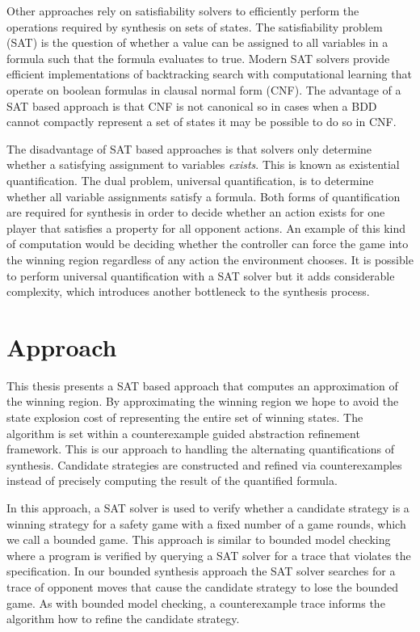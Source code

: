 Other approaches rely on satisfiability solvers to efficiently perform the operations required by synthesis on sets of states. The satisfiability problem (SAT) is the question of whether a value can be assigned to all variables in a formula such that the formula evaluates to true. Modern SAT solvers provide efficient implementations of backtracking search with computational learning that operate on boolean formulas in clausal normal form (CNF). The advantage of a SAT based approach is that CNF is not canonical so in cases when a BDD cannot compactly represent a set of states it may be possible to do so in CNF.

The disadvantage of SAT based approaches is that solvers only determine whether a satisfying assignment to variables \emph{exists}. This is known as existential quantification. The dual problem, universal quantification, is to determine whether all variable assignments satisfy a formula. Both forms of quantification are required for synthesis in order to decide whether an action exists for one player that satisfies a property for all opponent actions. An example of this kind of computation would be deciding whether the controller can force the game into the winning region regardless of any action the environment chooses. It is possible to perform universal quantification with a SAT solver but it adds considerable complexity, which introduces another bottleneck to the synthesis process.

\section{Approach}

This thesis presents a SAT based approach that computes an approximation of the winning region. By approximating the winning region we hope to avoid the state explosion cost of representing the entire set of winning states. The algorithm is set within a counterexample guided abstraction refinement framework. This is our approach to handling the alternating quantifications of synthesis. Candidate strategies are constructed and refined via counterexamples instead of precisely computing the result of the quantified formula.

In this approach, a SAT solver is used to verify whether a candidate strategy is a winning strategy for a safety game with a fixed number of a game rounds, which we call a bounded game. This approach is similar to bounded model checking where a program is verified by querying a SAT solver for a trace that violates the specification. In our bounded synthesis approach the SAT solver searches for a trace of opponent moves that cause the candidate strategy to lose the bounded game. As with bounded model checking, a counterexample trace informs the algorithm how to refine the candidate strategy.

